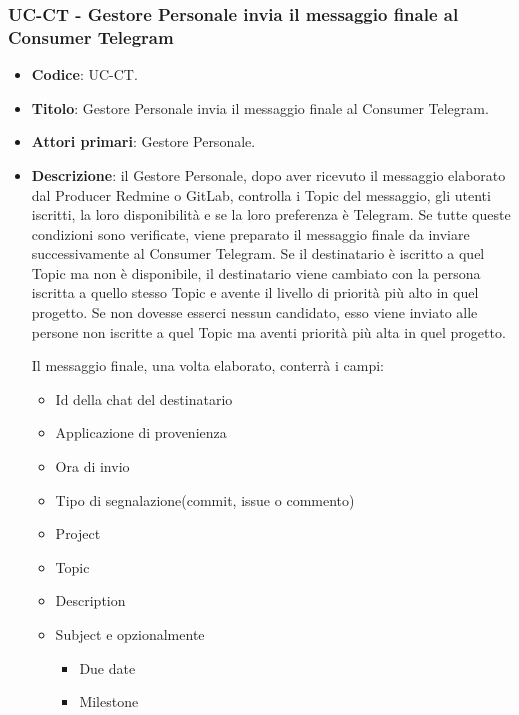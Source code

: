 \subsubsection{UC\theuccount-CT - Gestore Personale invia il messaggio finale al Consumer Telegram}
	\begin{itemize}
		\item \textbf{Codice}: UC\theuccount-CT.
		\item \textbf{Titolo}: Gestore Personale invia il messaggio finale al Consumer Telegram.
		\item \textbf{Attori primari}: Gestore Personale.
		\item \textbf{Descrizione}: il Gestore Personale, dopo aver ricevuto il messaggio elaborato
		dal Producer Redmine o GitLab, controlla i Topic del messaggio, gli utenti iscritti, la loro disponibilità e se la loro preferenza è Telegram.
		Se tutte queste condizioni sono verificate, viene preparato il messaggio finale da inviare successivamente al Consumer Telegram. 
		Se il destinatario è iscritto a quel Topic ma non è disponibile, il destinatario viene cambiato con la persona 
		iscritta a quello stesso Topic e avente il livello di priorità più alto in quel progetto. Se non dovesse
		esserci nessun candidato, esso viene inviato alle persone non iscritte a quel Topic ma aventi priorità più
		alta in quel progetto.\par
		Il messaggio finale, una volta elaborato, conterrà i campi:
		\begin{itemize}
			\item Id della chat del destinatario
			\item Applicazione di provenienza
			\item Ora di invio
			\item Tipo di segnalazione(commit, issue o commento)
			\item Project
			\item Topic
			\item Description
			\item Subject e opzionalmente
		 	\begin{itemize}
				\item Due date
				\item Milestone

\end{itemize}
\end{itemize}
\end{itemize}
